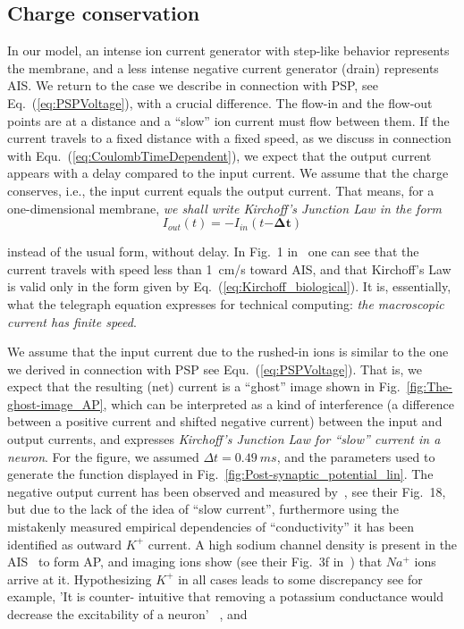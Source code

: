 \subsection{Charge conservation\label{sec:Physiology-ChargeConservation}}
In our model, an intense ion current generator with step-like behavior
represents the membrane, and a less intense negative current generator (drain)
represents 
AIS. We return to the case we describe in connection
with 
PSP, see Eq.~(\ref{eq:PSPVoltage}), with a crucial difference.
The flow-in and the flow-out points are at a distance and a ``slow''
ion current must flow between them. If the current travels to a fixed
distance with a fixed speed, as we discuss in connection with Equ.~(\ref{eq:CoulombTimeDependent}),
we expect that the output current appears with a delay compared to
the input current. We assume that the charge conserves, i.e., the
input current equals the output current. That means, for a one-dimensional membrane,
\emph{we shall write Kirchoff's Junction Law in the form}
\begin{equation}
	I_{out}(t)=-I_{in}(t\mathbf{-\Delta t})\label{eq:Kirchoff_biological}
\end{equation}

\noindent instead of the usual form, without delay. In Fig.~1 in~\cite{ActionPotentialGenerationNatrium:2008} one can see that the
current travels with speed less than 1~cm/s toward 
AIS, and
that Kirchoff's Law is valid only in the form given by Eq.~(\ref{eq:Kirchoff_biological}).
It is, essentially, what the telegraph equation expresses for technical
computing: \emph{the macroscopic current has finite speed}. 

We assume that the input current due to the rushed-in ions is similar
to the one we derived in connection with 
PSP see Equ.~(\ref{eq:PSPVoltage}).
That is, we expect that the resulting (net) current is a ``ghost''
image shown in Fig.~\ref{fig:The-ghost-image_AP}, which can be interpreted
as a kind of interference (a difference between a positive current and
shifted negative current) between the input and output currents, and
expresses \emph{Kirchoff's Junction Law for ``slow'' current in a neuron}.
For the figure, we assumed $\Delta t=0.49\ ms$, and the parameters
used to generate the function displayed in Fig.~\ref{fig:Post-synaptic_potential_lin}.
The negative output current has been observed and measured by~\cite{HodgkinHuxley:1952},
see their Fig.~18, but \textendash{} due to the lack of the idea
of ``slow current'', furthermore using the mistakenly measured empirical
dependencies of ``conductivity'' \textendash{} it has been identified
as outward $K^+$ current. 
A high sodium channel density is present in the 
AIS~\cite{ActionPotentialGenerationNatrium:2008}
to form
AP, and imaging ions show (see their Fig.~3f in~\cite{ActionPotentialGenerationNatrium:2008})
that $Na^+$ ions arrive at it. Hypothesizing $K^+$ in all cases leads to some discrepancy see for example, 'It is counter-
intuitive that removing a potassium conductance would
decrease the excitability of a neuron' ~\cite{BeanActionPotential:2007}, and 

